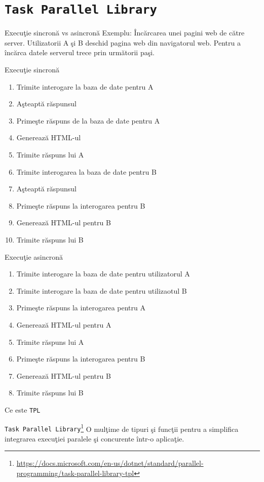 \documentclass[presentation]{beamer}
\begin{document}
\section{\texttt{Task Parallel Library}}
\label{sec:org6f1293e}
\begin{frame}[label={sec:org7727b0a}]{Execuţie sincronă vs asincronă}
Exemplu: Încărcarea unei pagini web de către server.
\vskip 0.1in
Utilizatorii A  şi B deschid pagina web din navigatorul web. Pentru a încărca datele serverul trece prin următorii paşi.
\end{frame}
\begin{frame}[label={sec:org3fac0fd}]{Execuţie sincronă}
\begin{enumerate}
\item Trimite interogare la baza de date pentru A
\item Aşteaptă răspunsul
\item Primeşte răspuns de la baza de date pentru A
\item Generează HTML-ul
\item Trimite răspuns lui A
\item Trimite interogarea la baza de date pentru B
\item Aşteaptă răspunsul
\item Primeşte răspuns la interogarea pentru B
\item Generează HTML-ul pentru B
\item Trimite răspuns lui B
\end{enumerate}
\end{frame}
\begin{frame}[label={sec:org8936d93}]{Execuţie asincronă}
\begin{enumerate}
\item Trimite interogare la baza de date pentru utilizatorul A
\item Trimite interogare la baza de date pentru utilizaotul B
\item Primeşte răspuns la interogarea pentru A
\item Generează HTML-ul pentru A
\item Trimite răspuns lui A
\item Primeşte răspuns la interogarea pentru B
\item Generează HTML-ul pentru B
\item Trimite răspuns lui B
\end{enumerate}
\end{frame}
\begin{frame}[label={sec:org790814f},fragile]{Ce este \texttt{TPL}}
 \begin{block}{\texttt{Task Parallel Library}\footnote{\url{https://docs.microsoft.com/en-us/dotnet/standard/parallel-programming/task-parallel-library-tpl}}}
\vskip 0.1in
O mulţime de tipuri şi funcţii pentru a simplifica integrarea execuţiei paralele şi concurente într-o aplicaţie.
\end{block}
\end{frame}
\end{document}
